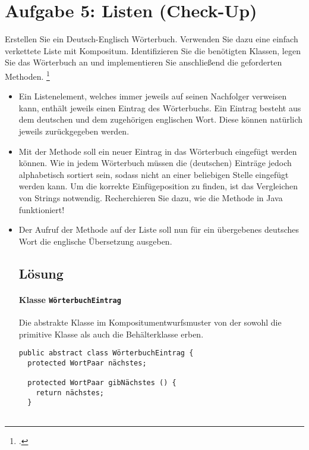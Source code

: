 \documentclass{lehramt-informatik-haupt}
\begin{document}
\section{Aufgabe 5: Listen (Check-Up)}

Erstellen Sie ein Deutsch-Englisch Wörterbuch. Verwenden Sie dazu eine
einfach verkettete Liste mit Kompositum. Identifizieren Sie die
benötigten Klassen, legen Sie das Wörterbuch an und implementieren Sie
anschließend die geforderten Methoden.
\footcite[Seite 4, Aufgabe 5]{aud:ab:5}

\begin{itemize}
\item Ein Listenelement, welches immer jeweils auf seinen Nachfolger
verweisen kann, enthält jeweils einen Eintrag des Wörterbuchs. Ein
Eintrag besteht aus dem deutschen und dem zugehörigen englischen Wort.
Diese können natürlich jeweils zurückgegeben werden.

\item Mit der Methode 
soll ein neuer Eintrag in das Wörterbuch eingefügt werden können. Wie in
jedem Wörterbuch müssen die (deutschen) Einträge jedoch alphabetisch
sortiert sein, sodass nicht an einer beliebigen Stelle eingefügt werden
kann. Um die korrekte Einfügeposition zu finden, ist das Vergleichen von
Strings notwendig. Recherchieren Sie dazu, wie die Methode
 in Java funktioniert!

\item Der Aufruf der Methode  auf der
Liste soll nun für ein übergebenes deutsches Wort die englische
Übersetzung ausgeben.

%

\subsection{Lösung}

\paragraph{Klasse \texttt{WörterbuchEintrag}}

Die abstrakte Klasse im Kompositumentwurfsmuster von der sowohl die
primitive Klasse als auch die Behälterklasse erben.

\begin{verbatim}
public abstract class WörterbuchEintrag {
  protected WortPaar nächstes;

  protected WortPaar gibNächstes () {
    return nächstes;
  }


\end{verbatim}
\end{itemize}
\end{document}
